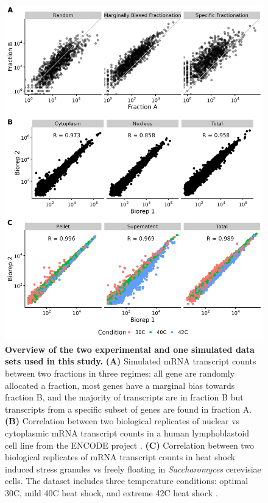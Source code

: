 \documentclass[../main.tex]{subfiles}
\begin{document}
\begin{figure}[h]

{\centering \includegraphics[width=0.8\linewidth]{figures/fractionation_dataset_summary.png} 

}

\caption[Overview of fractionation data sets.]{\textbf{Overview of the two experimental and one simulated data sets used in this study.} \textbf{(A)}  Simulated mRNA transcript counts between two fractions in three regimes: all gene are randomly allocated a fraction, most genes have a marginal bias towards fraction B, and the majority of transcripts are in fraction B but transcripts from a specific subset of genes are found in fraction A. 
\textbf{(B)} Correlation between two biological replicates of nuclear vs cytoplasmic mRNA transcript counts in a human lymphoblastoid cell line from the ENCODE project \parencite{Dunham2012}. \textbf{(C)} Correlation between two biological replicates of mRNA transcript counts in heat shock induced stress granules vs freely floating in \textit{Saccharomyces} cerevisiae cells. The dataset includes three temperature conditions: optimal 30C, mild 40C heat shock, and extreme 42C heat shock  \parencite{Iserman2020}.} \label{fig:fractionation-datasets}
\end{figure}
\end{document}
